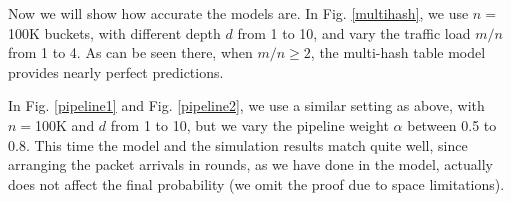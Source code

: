 Now we will show how accurate the models are. 
In Fig. \ref{multihash},
we use $n=$100K buckets, with different depth $d$ from 1 to 10, 
and vary the traffic load $m/n$ from 1 to 4. As can be seen there, 
when $m/n \ge 2$, the multi-hash table model provides nearly perfect predictions.

In Fig. \ref{pipeline1} and Fig. \ref{pipeline2}, we use a similar setting as above, with $n=$100K and $d$ from 1 to 10,
but we vary the pipeline weight $\alpha$ between 0.5 to 0.8. 
This time the model and the simulation results match quite well, 
since  arranging the packet arrivals in rounds, as we have done in the model,  
actually does not affect the final probability (we omit the proof due to space limitations).

